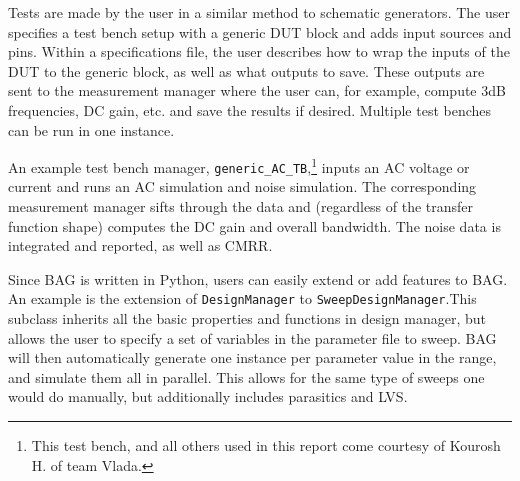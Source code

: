 Tests are made by the user in a similar method to schematic generators. The user specifies a test bench setup with a generic DUT block and adds input sources and pins. Within a specifications file, the user describes how to wrap the inputs of the DUT to the generic block, as well as what outputs to save. These outputs are sent to the measurement manager where the user can, for example, compute 3dB frequencies, DC gain, etc. and save the results if desired. Multiple test benches can be run in one instance.

An example test bench manager, \texttt{generic\_AC\_TB},\footnote{This test bench, and all others used in this report come courtesy of Kourosh H. of team Vlada.} inputs an AC voltage or current and runs an AC simulation and noise simulation. The corresponding measurement manager sifts through the data and (regardless of the transfer function shape) computes the DC gain and overall bandwidth. The noise data is integrated and reported, as well as CMRR. 

Since BAG is written in Python, users can easily extend or add features to BAG. An example is the extension of \texttt{DesignManager} to \texttt{SweepDesignManager}.This subclass inherits all the basic properties and functions in design manager, but allows the user to specify a set of variables in the parameter file to sweep. BAG will then automatically generate one instance per parameter value in the range, and simulate them all in parallel. This allows for the same type of sweeps one would do manually, but additionally includes parasitics and LVS.